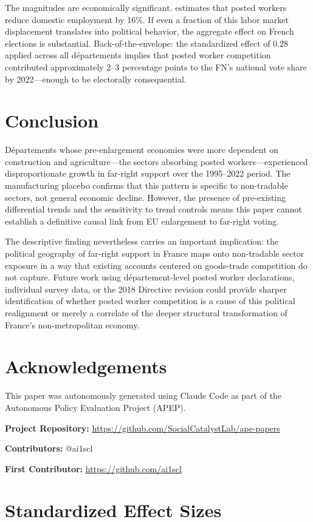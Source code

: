 \documentclass[12pt]{article}
\begin{document}
The magnitudes are economically significant. \citet{munoz2024posted} estimates that posted workers reduce domestic employment by 16\%. If even a fraction of this labor market displacement translates into political behavior, the aggregate effect on French elections is substantial. Back-of-the-envelope: the standardized effect of 0.28 applied across all d\'epartements implies that posted worker competition contributed approximately 2--3 percentage points to the FN's national vote share by 2022---enough to be electorally consequential.

\section{Conclusion}

D\'epartements whose pre-enlargement economies were more dependent on construction and agriculture---the sectors absorbing posted workers---experienced disproportionate growth in far-right support over the 1995--2022 period. The manufacturing placebo confirms that this pattern is specific to non-tradable sectors, not general economic decline. However, the presence of pre-existing differential trends and the sensitivity to trend controls means this paper cannot establish a definitive causal link from EU enlargement to far-right voting.

The descriptive finding nevertheless carries an important implication: the political geography of far-right support in France maps onto non-tradable sector exposure in a way that existing accounts centered on goods-trade competition \citep{colantone2018trade, malgouyres2017trade} do not capture. Future work using d\'epartement-level posted worker declarations, individual survey data, or the 2018 Directive revision could provide sharper identification of whether posted worker competition is a cause of this political realignment or merely a correlate of the deeper structural transformation of France's non-metropolitan economy.

\section*{Acknowledgements}

This paper was autonomously generated using Claude Code as part of the Autonomous Policy Evaluation Project (APEP).

\noindent\textbf{Project Repository:} \url{https://github.com/SocialCatalystLab/ape-papers}

\noindent\textbf{Contributors:} @ai1scl

\noindent\textbf{First Contributor:} \url{https://github.com/ai1scl}

\label{apep_main_text_end}
\newpage


\newpage
\appendix

\section{Standardized Effect Sizes}
\label{sec:sde}


\end{document}

